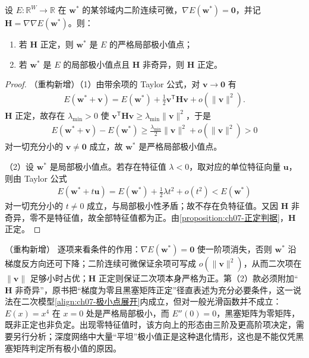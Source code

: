 \documentclass[../../main.tex]{subfiles}
\begin{document}
\begin{theorem}[局部极小值的二阶条件]\label{theorem:ch07-二阶条件}
设 $E:\mathbb{R}^{W}\to\mathbb{R}$ 在 $\mathbf{w}^{\ast}$ 的某邻域内二阶连续可微，$\nabla E(\mathbf{w}^{\ast})=\mathbf{0}$，并记 $\mathbf{H}=\nabla\nabla E(\mathbf{w}^{\ast})$。则：
\begin{enumerate}
\item 若 $\mathbf{H}$ 正定，则 $\mathbf{w}^{\ast}$ 是 $E$ 的严格局部极小值点；
\item 若 $\mathbf{w}^{\ast}$ 是 $E$ 的局部极小值点且 $\mathbf{H}$ 非奇异，则 $\mathbf{H}$ 正定。
\end{enumerate}
\end{theorem}
\begin{proof}
（重构新增）（1）由带余项的 Taylor 公式，对 $\mathbf{v}\to\mathbf{0}$ 有
\begin{align*}
E(\mathbf{w}^{\ast}+\mathbf{v}) = E(\mathbf{w}^{\ast})+\frac{1}{2}\mathbf{v}^{\mathsf T}\mathbf{H}\mathbf{v}+o(\|\mathbf{v}\|^{2}).
\end{align*}
$\mathbf{H}$ 正定，故存在 $\lambda_{\min}>0$ 使 $\mathbf{v}^{\mathsf T}\mathbf{H}\mathbf{v}\geqslant\lambda_{\min}\|\mathbf{v}\|^{2}$，于是
\begin{align*}
E(\mathbf{w}^{\ast}+\mathbf{v})-E(\mathbf{w}^{\ast}) \geqslant \frac{\lambda_{\min}}{2}\|\mathbf{v}\|^{2}+o(\|\mathbf{v}\|^{2}) > 0
\end{align*}
对一切充分小的 $\mathbf{v}\neq\mathbf{0}$ 成立，故 $\mathbf{w}^{\ast}$ 是严格局部极小值点。

（2）设 $\mathbf{w}^{\ast}$ 是局部极小值点。若存在特征值 $\lambda<0$，取对应的单位特征向量 $\mathbf{u}$，则由 Taylor 公式
\begin{align*}
E(\mathbf{w}^{\ast}+t\mathbf{u}) = E(\mathbf{w}^{\ast})+\frac{1}{2}\lambda t^{2}+o(t^{2}) < E(\mathbf{w}^{\ast})
\end{align*}
对一切充分小的 $t\neq0$ 成立，与局部极小性矛盾；故不存在负特征值。又因 $\mathbf{H}$ 非奇异，零不是特征值，故全部特征值都为正。由\cref{proposition:ch07-正定判据}，$\mathbf{H}$ 正定。
\end{proof}

\begin{remark}（重构新增）
逐项来看条件的作用：$\nabla E(\mathbf{w}^{\ast})=\mathbf{0}$ 使一阶项消失，否则 $\mathbf{w}^{\ast}$ 沿梯度反方向还可下降；二阶连续可微保证余项可写成 $o(\|\mathbf{v}\|^{2})$，从而二次项在 $\|\mathbf{v}\|$ 足够小时占优；$\mathbf{H}$ 正定则保证二次项本身严格为正。第（2）款必须附加“$\mathbf{H}$ 非奇异”，原书把“梯度为零且黑塞矩阵正定”径直表述为充分必要条件，这一说法在二次模型\eqref{align:ch07-极小点展开}内成立，但对一般光滑函数并不成立：$E(x)=x^{4}$ 在 $x=0$ 处是严格局部极小，而 $E''(0)=0$，黑塞矩阵为零矩阵，既非正定也非负定。出现零特征值时，该方向上的形态由三阶及更高阶项决定，需要另行分析；深度网络中大量“平坦”极小值正是这种退化情形，这也是不能仅凭黑塞矩阵判定所有极小值的原因。
\end{remark}
\end{document}
